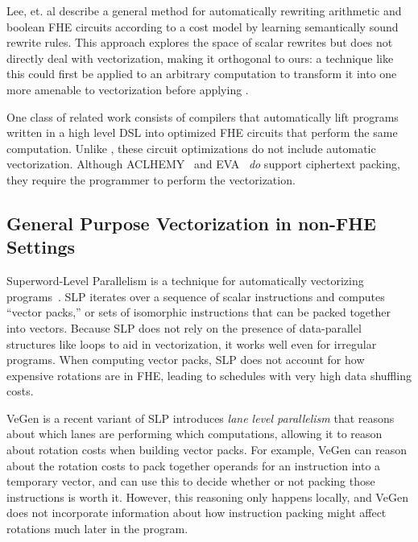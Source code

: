 Lee, et. al \cite{CircuitRewriting} describe a general method for automatically rewriting arithmetic and boolean FHE circuits according to a cost model by learning semantically sound rewrite rules.
This approach explores the space of scalar rewrites but does not directly deal with vectorization, making it orthogonal to ours: a technique like this could first be applied to an arbitrary computation to transform it into one more amenable to vectorization before applying \system.

One class of related work consists of compilers \cite{Ramparts, ALCHEMY, EVA, Cingulata} that automatically lift programs written in a high level DSL into optimized FHE circuits that perform the same computation.
Unlike \system, these circuit optimizations do not include automatic vectorization. Although ACLHEMY~\cite{ALCHEMY} and EVA~\cite{EVA} \textit{do} support ciphertext packing, they require the programmer to perform the vectorization.

\subsection{General Purpose Vectorization in non-FHE Settings}
Superword-Level Parallelism is a technique for automatically vectorizing programs~\cite{SLP}.
SLP iterates over a sequence of scalar instructions and computes ``vector packs,'' or sets of isomorphic instructions that can be packed together into vectors.
Because SLP does not rely on the presence of data-parallel structures like loops to aid in vectorization, it works well even for irregular programs.
When computing vector packs, SLP does not account for how expensive rotations are in FHE, leading to schedules with very high data shuffling costs. 

VeGen \cite{VeGen} is a recent variant of SLP introduces {\em lane level parallelism} that reasons about which lanes are performing which computations, allowing it to reason about rotation costs when building vector packs.
For example, VeGen can reason about the rotation costs to pack together operands for an instruction into a temporary vector, and can use this to decide whether or not packing those instructions is worth it.
However, this reasoning only happens locally, and VeGen does not incorporate information about how instruction packing might affect rotations much later in the program.

